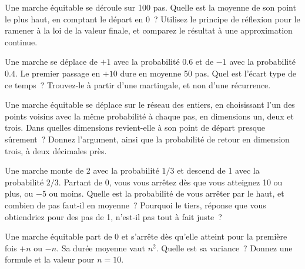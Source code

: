\begin{question}\label{iq:iv1:random-walks-and-martingales:19}
Une marche équitable se déroule sur 100 pas. Quelle est la moyenne de son point le plus haut, en comptant le départ en 0~? Utilisez le principe de réflexion pour le ramener à la loi de la valeur finale, et comparez le résultat à une approximation continue.
\end{question}

\begin{question}\label{iq:iv1:random-walks-and-martingales:20}
Une marche se déplace de $+1$ avec la probabilité $0.6$ et de $-1$ avec la probabilité $0.4$. Le premier passage en $+10$ dure en moyenne 50 pas. Quel est l'écart type de ce temps~? Trouvez-le à partir d'une martingale, et non d'une récurrence.
\end{question}

\begin{question}\label{iq:iv1:random-walks-and-martingales:21}
Une marche équitable se déplace sur le réseau des entiers, en choisissant l'un des points voisins avec la même probabilité à chaque pas, en dimensions un, deux et trois. Dans quelles dimensions revient-elle à son point de départ presque sûrement~? Donnez l'argument, ainsi que la probabilité de retour en dimension trois, à deux décimales près.
\end{question}

\begin{question}\label{iq:iv1:random-walks-and-martingales:22}
Une marche monte de 2 avec la probabilité $1/3$ et descend de 1 avec la probabilité $2/3$. Partant de 0, vous vous arrêtez dès que vous atteignez 10 ou plus, ou $-5$ ou moins. Quelle est la probabilité de vous arrêter par le haut, et combien de pas faut-il en moyenne~? Pourquoi le tiers, réponse que vous obtiendriez pour des pas de 1, n'est-il pas tout à fait juste~?
\end{question}

\begin{question}\label{iq:iv1:random-walks-and-martingales:23}
Une marche équitable part de 0 et s'arrête dès qu'elle atteint pour la première fois $+n$ ou $-n$. Sa durée moyenne vaut $n^2$. Quelle est sa variance~? Donnez une formule et la valeur pour $n = 10$.
\end{question}

